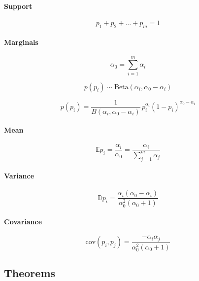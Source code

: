 \documentclass{article}
\newcommand{\expect}[1]{\mathbb{E} #1}
\begin{document}
\paragraph{Support}
\begin{equation}
p_1 + p_2 + \ldots + p_m = 1
\end{equation}

\paragraph{Marginals}
\begin{equation*}
\alpha_0 = \sum_{i=1}^m{\alpha_i}
\end{equation*}

\begin{equation*}
p(p_i) \sim \textrm{Beta}(\alpha_i, \alpha_0 - \alpha_i)
\end{equation*}

\begin{equation}
p(p_i) = \frac{1}{B(\alpha_i, \alpha_0 - \alpha_i)} \, p_i^{\alpha_i} (1 - p_i)^{\alpha_0 - \alpha_i}
\end{equation}

\paragraph{Mean}
\begin{equation}
\expect{p_i} = \frac{\alpha_i}{\alpha_0} = \frac{\alpha_i}{\sum\limits_{j=1}^m{\alpha_j}}
\end{equation}

\paragraph{Variance}
\begin{equation}
\mathbb{D}{p_i} = \frac{\alpha_i(\alpha_0 - \alpha_i)}{\alpha_0^2(\alpha_0 + 1)}
\end{equation}

\paragraph{Covariance}
\begin{equation}
\textrm{cov}(p_i, p_j) = \frac{-\alpha_i\alpha_j}{\alpha_0^2(\alpha_0 + 1)}
\end{equation}

\subsection{Theorems}
\end{document}
